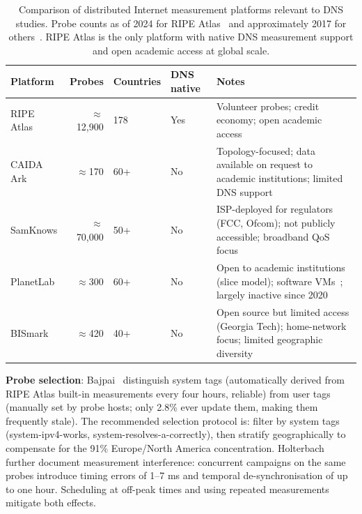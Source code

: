 \begin{table}[H]
\centering
\small
\begin{tabularx}{\linewidth}{p{2.6cm} r p{2.0cm} p{1.8cm} X}
\toprule
\textbf{Platform} & \textbf{Probes} & \textbf{Countries} & \textbf{\ac{DNS} native} & \textbf{Notes} \\
\midrule
RIPE Atlas       & $\approx$12,900 & 178 & Yes & Volunteer probes; credit economy; open academic access~\cite{Nosyk2025} \\
CAIDA Ark        & $\approx$170    & 60+ & No  & Topology-focused; data available on request to academic institutions; limited \ac{DNS} support~\cite{Bajpai2017} \\
SamKnows         & $\approx$70,000 & 50+ & No  & \ac{ISP}-deployed for regulators (FCC, Ofcom); not publicly accessible; broadband QoS focus~\cite{Bajpai2017} \\
PlanetLab        & $\approx$300    & 60+ & No  & Open to academic institutions (slice model); software VMs~\cite{Cicalese2015}; largely inactive since 2020 \\
BISmark          & $\approx$420    & 40+ & No  & Open source but limited access (Georgia Tech); home-network focus; limited geographic diversity~\cite{Bajpai2017} \\
\bottomrule
\end{tabularx}
\caption{Comparison of distributed Internet measurement platforms relevant to \ac{DNS} studies. Probe counts as of 2024 for RIPE Atlas~\cite{Nosyk2025} and approximately 2017 for others~\cite{Bajpai2017}. RIPE Atlas is the only platform with native \ac{DNS} measurement support and open academic access at global scale.}
\label{tab:platforms}
\end{table}

\textbf{Probe selection}: Bajpai~\cite{Bajpai2017} distinguish system tags (automatically derived from RIPE Atlas built-in measurements every four hours, reliable) from user tags (manually set by probe hosts; only 2.8\% ever update them, making them frequently stale). The recommended selection protocol is: filter by system tags (system-ipv4-works, system-resolves-a-correctly), then stratify geographically to compensate for the 91\% Europe/North America concentration. Holterbach~\cite{Holterbach2015} further document measurement interference: concurrent campaigns on the same probes introduce timing errors of 1–7 ms and temporal de-synchronisation of up to one hour. Scheduling at off-peak times and using repeated measurements mitigate both effects.

